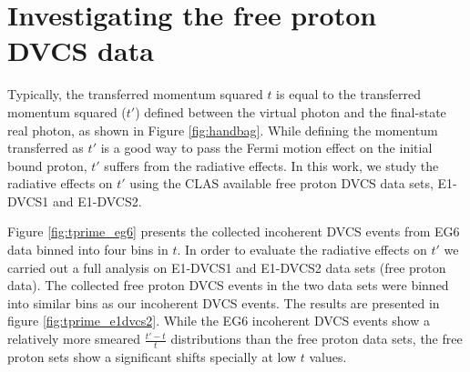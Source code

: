 \documentclass[a4paper,11pt,twoside]{article}
\begin{document}
\section{Investigating the free proton DVCS data}

Typically, the transferred momentum squared $t$ is equal to the transferred 
momentum squared ($t'$) defined between the virtual photon and the final-state 
real photon, as shown in Figure \ref{fig:handbag}.  While defining the momentum 
transferred as $t'$ is a good way to pass the Fermi motion effect on the 
initial bound proton, $t'$ suffers from the radiative effects. In this work, we 
study the radiative effects on $t'$ using the CLAS available free proton DVCS 
data sets, E1-DVCS1 and E1-DVCS2.

Figure \ref{fig:tprime_eg6} presents the collected incoherent DVCS events from 
EG6 data binned into four bins in $t$. In order to evaluate the radiative 
effects on $t'$ we carried out a full analysis on E1-DVCS1 and E1-DVCS2 data 
sets (free proton data). The collected free proton DVCS events in the two data 
sets were binned into similar bins as our incoherent DVCS events. The results 
are presented in figure \ref{fig:tprime_e1dvcs2}.  While the EG6 incoherent 
DVCS events show a relatively more smeared $\frac{t'-t}{t}$ distributions than 
the free proton data sets, the free proton sets show a significant shifts 
specially at low $t$ values.  
\end{document}
